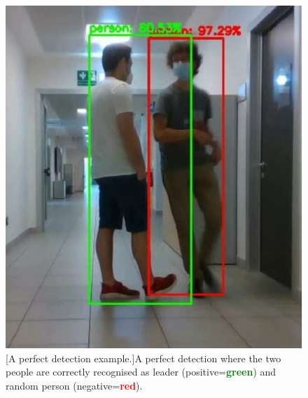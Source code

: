 \begin{figure}
\begin{minipage}{.49\textwidth}
	\end{minipage}
	\begin{minipage}{.49\textwidth}
		\centering
		\includegraphics[width=1\linewidth]{images/solution/leaderSubjectOk}
		\captionsetup{margin=0.2cm}
		[A perfect detection example.]{A perfect detection where the two people are correctly recognised as leader (positive=\textbf{\textcolor{green}{green}}) and random person (negative=\textbf{\textcolor{red}{red}}).}
		\label{fig:doubleDetectionOk}
	\end{minipage}
\end{figure}


